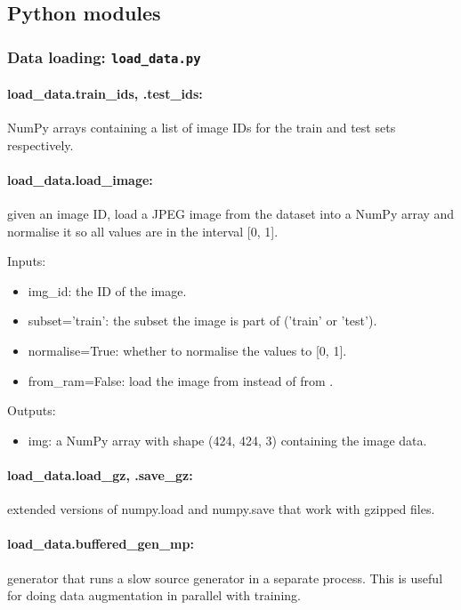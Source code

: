 \documentclass[a4paper,10pt]{article}
\begin{document}
\subsection{Python modules}

\subsubsection{Data loading: \texttt{load\_data.py}}

\paragraph{load\_data.train\_ids, .test\_ids:} NumPy arrays containing a list of image IDs for the train and test sets respectively.

\paragraph{load\_data.load\_image:} given an image ID, load a JPEG image from the dataset into a NumPy array and normalise it so all values are in the interval [0, 1].

Inputs:
 \begin{itemize}
  \item{img\_id:} the ID of the image.
  \item{subset='train':} the subset the image is part of ('train' or 'test').
  \item{normalise=True:} whether to normalise the values to [0, 1].
  \item{from\_ram=False:} load the image from  instead of from .
 \end{itemize}

Outputs:
\begin{itemize}
 \item{img:} a NumPy array with shape (424, 424, 3) containing the image data.
\end{itemize}

\paragraph{load\_data.load\_gz, .save\_gz:} extended versions of numpy.load and numpy.save that work with gzipped files.

\paragraph{load\_data.buffered\_gen\_mp:} generator that runs a slow source generator in a separate process. This is useful for doing data augmentation in parallel with training.
\end{document}
